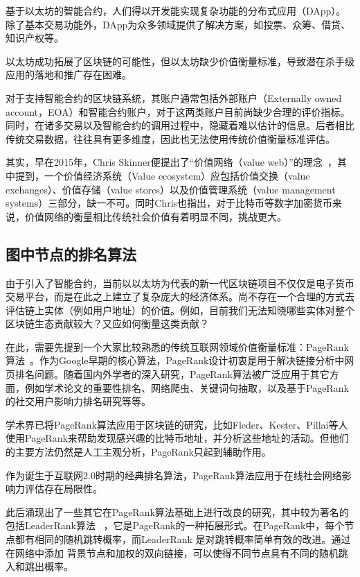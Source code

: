 基于以太坊的智能合约，人们得以开发能实现复杂功能的分布式应用（DApp）。除了基本交易功能外，DApp为众多领域提供了解决方案，如投票、众筹、借贷、知识产权等。

以太坊成功拓展了区块链的可能性，但以太坊缺少价值衡量标准，导致潜在杀手级应用的落地和推广存在困难。

对于支持智能合约的区块链系统，其账户通常包括外部账户（Externally owned account，EOA）和智能合约账户，对于这两类账户目前尚缺少合理的评价指标。同时，在诸多交易以及智能合约的调用过程中，隐藏着难以估计的信息。后者相比传统交易数据，往往具有更多维度，因此也无法使用传统价值衡量标准评估。

其实，早在2015年，Chris Skinner便提出了“价值网络（value web）”的理念~\cite{ChrisSkinner}，其中提到，一个价值经济系统（Value ecosystem）应包括价值交换（value exchanges）、价值存储（value stores）以及价值管理系统（value management systems）三部分，缺一不可。同时Chris也指出，对于比特币等数字加密货币来说，价值网络的衡量相比传统社会价值有着明显不同，挑战更大。






\subsection{图中节点的排名算法}

由于引入了智能合约，当前以以太坊为代表的新一代区块链项目不仅仅是电子货币交易平台，而是在此之上建立了复杂庞大的经济体系。尚不存在一个合理的方式去评估链上实体（例如用户地址）的价值。例如，目前我们无法知晓哪些实体对整个区块链生态贡献较大？又应如何衡量这类贡献？

在此，需要先提到一个大家比较熟悉的传统互联网领域价值衡量标准：PageRank算法~\cite{page1999pagerank}。作为Google早期的核心算法，PageRank设计初衷是用于解决链接分析中网页排名问题。随着国内外学者的深入研究，PageRank算法被广泛应用于其它方面，例如学术论文的重要性排名、网络爬虫、关键词句抽取，以及基于PageRank的社交用户影响力排名研究等等。

学术界已将PageRank算法应用于区块链的研究，比如Fleder、Kester、Pillai等人~\cite{Fleder2015} 使用PageRank来帮助发现感兴趣的比特币地址，并分析这些地址的活动。但他们的主要方法仍然是人工主观分析，PageRank只起到辅助作用。

作为诞生于互联网2.0时期的经典排名算法，PageRank算法应用于在线社会网络影响力评估存在局限性。

此后涌现出了一些其它在PageRank算法基础上进行改良的研究，其中较为著名的包括LeaderRank算法 ~\cite{Li2014}，它是PageRank的一种拓展形式。在PageRank中，每个节点都有相同的随机跳转概率，而LeaderRank 是对跳转概率简单有效的改进。通过在网络中添加 背景节点和加权的双向链接，可以使得不同节点具有不同的随机跳入和跳出概率。

